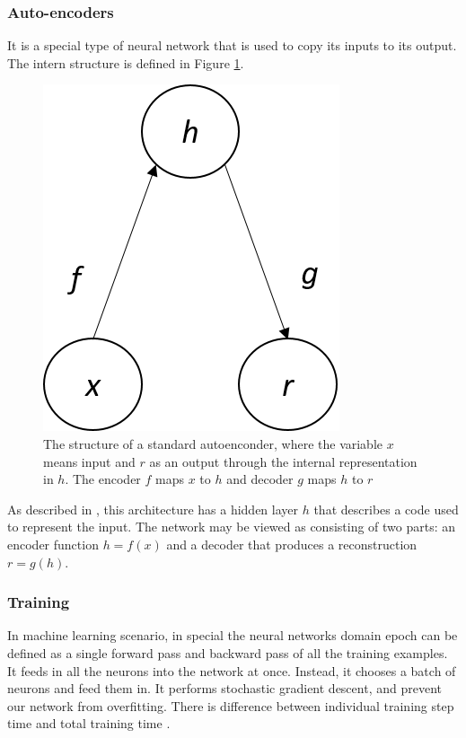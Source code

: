 \subsubsection{Auto-encoders}\label{auto-encoder}

It is a special type of neural network that is used to copy its inputs to its output. The intern structure is defined in Figure \ref{fig:autoencoder}. 

\begin{figure}[H]
\centering
\includegraphics[scale=0.7]{imagens/autoencoder.png}
\caption{The structure of a standard autoenconder, where the variable $x$ means input and $r$ as an output through the internal representation in $h$. The encoder $f$ maps $x$ to $h$ and decoder $g$ maps $h$ to $r$}
\label{fig:autoencoder}
\end{figure}

As described in \cite{yang2020feedback}, this architecture has a hidden layer $h$ that describes a code used to represent the input. The network may be viewed as consisting of two parts: an encoder function $h=f(x)$ and a decoder that produces a reconstruction $r=g(h)$.

\subsubsection{Training}

In machine learning scenario, in special the neural networks domain epoch can be defined as a single forward pass and backward pass of all the training examples. It feeds in all the neurons into the network at once. Instead, it chooses a batch of neurons and feed them in. It performs stochastic gradient descent, and prevent our network from overfitting. There is difference between individual training step time and total training time \cite{pascanu2013difficulty}. 


